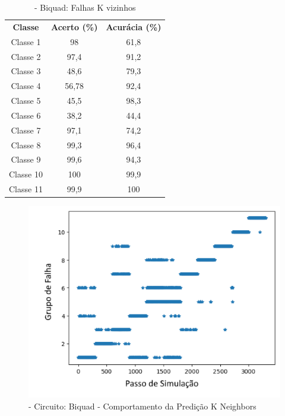 \begin{itemize}
 \begin{table}[ht]
\centering
\begin{tabular}{ccc}
\textbf{Classe} & \textbf{Acerto (\%)} & \textbf{Acurácia (\%)} \\
Classe 1        & 98                   & 61,8                    \\
Classe 2        & 97,4                  & 91,2                    \\
Classe 3        & 48,6                  & 79,3                    \\
Classe 4        & 56,78                  & 92,4                    \\
Classe 5        & 45,5                  & 98,3                    \\
Classe 6        & 38,2                  & 44,4                    \\
Classe 7        & 97,1                  & 74,2                    \\
Classe 8        & 99,3                  & 96,4                    \\
Classe 9        & 99,6                  & 94,3                    \\
Classe 10       & 100                  & 99,9                    \\
Classe 11       & 99,9                  & 100                                 
\end{tabular}
\caption{\label{tab:BiqnKvizinhos}- Biquad: Falhas K vizinhos}
\end{table}


  \begin{figure}[H]
        \begin{center}
        \includegraphics[width=13cm]{./01_Pre_textuais/biquad_figs/KNeighborsClassifier_Biquad_Highpass_Filter_mc_+_4bitPRBS_[FALHA]raw.png}
        \caption{\label{fig:KNeighborsClassifieBiq}- Circuito: Biquad - Comportamento da Predição K Neighbors }
        \end{center}
        \end{figure}


\end{itemize}
